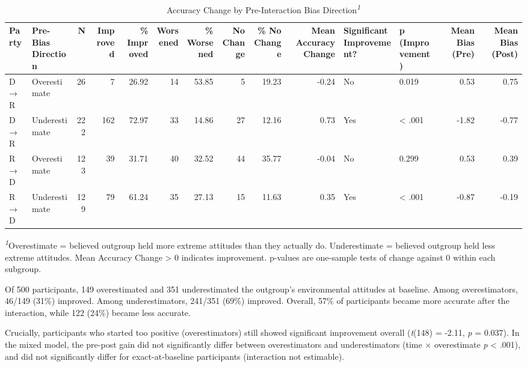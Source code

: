\documentclass[
  11pt,
  oneside]{article}
\begin{document}
\begin{table}
\caption*{
{\large Accuracy Change by Pre-Interaction Bias Direction\textsuperscript{\textit{1}}}
} 
\fontsize{12.0pt}{14.4pt}\selectfont
\begin{tabular*}{\linewidth}{@{\extracolsep{\fill}}llrrrrrrrrllrr}
\toprule
Party & Pre-Bias Direction & N & Improved & \% Improved & Worsened & \% Worsened & No Change & \% No Change & Mean Accuracy Change & Significant Improvement? & p (Improvement) & Mean Bias (Pre) & Mean Bias (Post) \\ 
\midrule\addlinespace[2.5pt]
D→R & Overestimate & 26 & 7 & 26.92 & 14 & 53.85 & 5 & 19.23 & -0.24 & No & 0.019 & 0.53 & 0.75 \\ 
D→R & Underestimate & 222 & 162 & 72.97 & 33 & 14.86 & 27 & 12.16 & 0.73 & Yes & < .001 & -1.82 & -0.77 \\ 
R→D & Overestimate & 123 & 39 & 31.71 & 40 & 32.52 & 44 & 35.77 & -0.04 & No & 0.299 & 0.53 & 0.39 \\ 
R→D & Underestimate & 129 & 79 & 61.24 & 35 & 27.13 & 15 & 11.63 & 0.35 & Yes & < .001 & -0.87 & -0.19 \\ 
\bottomrule
\end{tabular*}
\begin{minipage}{\linewidth}
\textsuperscript{\textit{1}}Overestimate = believed outgroup held more extreme attitudes than they actually do. Underestimate = believed outgroup held less extreme attitudes. Mean Accuracy Change > 0 indicates improvement. p-values are one-sample tests of change against 0 within each subgroup.\\
\end{minipage}
\end{table}

Of 500 participants, 149 overestimated and 351 underestimated the
outgroup's environmental attitudes at baseline. Among overestimators,
46/149 (31\%) improved. Among underestimators, 241/351 (69\%) improved.
Overall, 57\% of participants became more accurate after the
interaction, while 122 (24\%) became less accurate.

Crucially, participants who started too positive (overestimators) still
showed significant improvement overall (\emph{t}(148) = -2.11, \emph{p}
= 0.037). In the mixed model, the pre-post gain did not significantly
differ between overestimators and underestimators (time × overestimate
\emph{p} \textless{} .001), and did not significantly differ for
exact-at-baseline participants (interaction not estimable).
\end{document}
